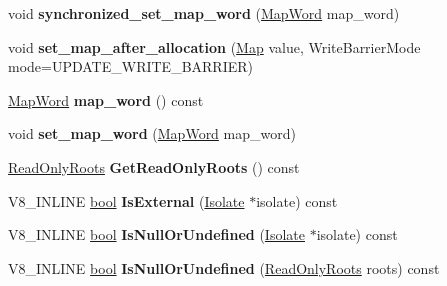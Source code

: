 \begin{DoxyCompactItemize}
void {\bfseries synchronized\+\_\+set\+\_\+map\+\_\+word} (\mbox{\hyperlink{classv8_1_1internal_1_1MapWord}{Map\+Word}} map\+\_\+word)
\item 
\mbox{\label{classv8_1_1internal_1_1HeapObject_ac150c4ac431c0fc1d5b6d4f9587d5260}} 
void {\bfseries set\+\_\+map\+\_\+after\+\_\+allocation} (\mbox{\hyperlink{classv8_1_1internal_1_1Map}{Map}} value, Write\+Barrier\+Mode mode=U\+P\+D\+A\+T\+E\+\_\+\+W\+R\+I\+T\+E\+\_\+\+B\+A\+R\+R\+I\+ER)
\item 
\mbox{\label{classv8_1_1internal_1_1HeapObject_ac41c95e2752e17cb33a931bc698e0df5}} 
\mbox{\hyperlink{classv8_1_1internal_1_1MapWord}{Map\+Word}} {\bfseries map\+\_\+word} () const
\item 
\mbox{\label{classv8_1_1internal_1_1HeapObject_ac765f37bdbe72ec7ebf00483cfa1c8d5}} 
void {\bfseries set\+\_\+map\+\_\+word} (\mbox{\hyperlink{classv8_1_1internal_1_1MapWord}{Map\+Word}} map\+\_\+word)
\item 
\mbox{\label{classv8_1_1internal_1_1HeapObject_a10519bb923a63874b8a65eacc5b32d9f}} 
\mbox{\hyperlink{classv8_1_1internal_1_1ReadOnlyRoots}{Read\+Only\+Roots}} {\bfseries Get\+Read\+Only\+Roots} () const
\item 
\mbox{\label{classv8_1_1internal_1_1HeapObject_ad99bee98982cccf9290d50dc9974cc27}} 
V8\+\_\+\+I\+N\+L\+I\+NE \mbox{\hyperlink{classbool}{bool}} {\bfseries Is\+External} (\mbox{\hyperlink{classv8_1_1internal_1_1Isolate}{Isolate}} $\ast$isolate) const
\item 
\mbox{\label{classv8_1_1internal_1_1HeapObject_aca258844bb87ea891618543da4628f02}} 
V8\+\_\+\+I\+N\+L\+I\+NE \mbox{\hyperlink{classbool}{bool}} {\bfseries Is\+Null\+Or\+Undefined} (\mbox{\hyperlink{classv8_1_1internal_1_1Isolate}{Isolate}} $\ast$isolate) const
\item 
\mbox{\label{classv8_1_1internal_1_1HeapObject_a2e2f6f0f5cc2f54e618c9de6a922d0d9}} 
V8\+\_\+\+I\+N\+L\+I\+NE \mbox{\hyperlink{classbool}{bool}} {\bfseries Is\+Null\+Or\+Undefined} (\mbox{\hyperlink{classv8_1_1internal_1_1ReadOnlyRoots}{Read\+Only\+Roots}} roots) const

\end{DoxyCompactItemize}
